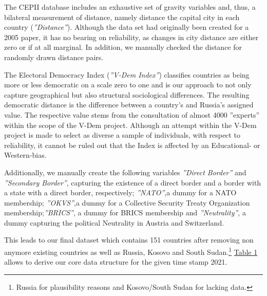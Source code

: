 \documentclass[12pt,a4paper]{article}
\begin{document}
\pagebreak
The CEPII database includes an exhaustive set of gravity variables and, thus, a bilateral measurement of distance, namely distance the capital city in each country (\textit{''Distance''}). Although the data set had originally been created for a 2005 paper, it has no bearing on reliability, as changes in city distance are either zero or if at all marginal. In addition, we manually checked the distance for randomly drawn distance pairs.

The Electoral Democracy Index (\textit{''V-Dem Index''}) classifies countries as being more or less democratic  on a scale zero to one and is our approach to not only capture geographical but also structural sociological differences. The resulting democratic distance is the difference between a country's and Russia's assigned value. The respective value stems from the consultation of almost 4000 ''experts'' within the scope of the V-Dem project. Although an attempt within the V-Dem project is made to select as diverse a sample of individuals, with respect to reliability, it cannot be ruled out that the Index is affected by an Educational- or Western-bias.

Additionally, we manually create the following variables \textit{''Direct Border''} and \textit{''Secondary Border''}, capturing the existence of a direct border and a border with a state with a direct border, respectively; \textit{''NATO''},a dummy for a NATO membership; \textit{''OKVS''},a dummy for a Collective Security Treaty Organization membership;\textit{''BRICS''}, a dummy for BRICS membership and \textit{''Neutrality''}, a dummy capturing the political Neutrality in Austria and Switzerland. 


This leads to our final dataset which contains 151 countries after removing non anymore existing countries as well as Russia, Kosovo and South Sudan.\footnote{Russia for plausibility reasons	and Kosovo/South Sudan for lacking data.} \hyperref[t:1]{\color{blue} Table 1} allows to derive our core data structure for the given time stamp 2021.
\end{document}
